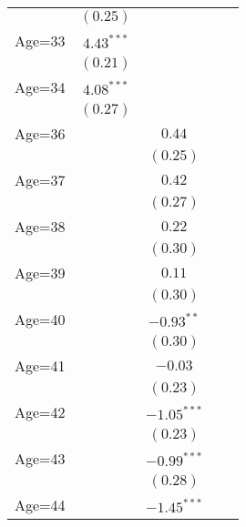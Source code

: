 \documentclass[fullpage]{paper}
\begin{document}
\begin{center}
\begin{longtable}{l c c c c }
            & $(0.25)$      &               &               &               \\
Age=33      & $4.43^{***}$  &               &               &               \\
            & $(0.21)$      &               &               &               \\
Age=34      & $4.08^{***}$  &               &               &               \\
            & $(0.27)$      &               &               &               \\
Age=36      &               & $0.44$        &               &               \\
            &               & $(0.25)$      &               &               \\
Age=37      &               & $0.42$        &               &               \\
            &               & $(0.27)$      &               &               \\
Age=38      &               & $0.22$        &               &               \\
            &               & $(0.30)$      &               &               \\
Age=39      &               & $0.11$        &               &               \\
            &               & $(0.30)$      &               &               \\
Age=40      &               & $-0.93^{**}$  &               &               \\
            &               & $(0.30)$      &               &               \\
Age=41      &               & $-0.03$       &               &               \\
            &               & $(0.23)$      &               &               \\
Age=42      &               & $-1.05^{***}$ &               &               \\
            &               & $(0.23)$      &               &               \\
Age=43      &               & $-0.99^{***}$ &               &               \\
            &               & $(0.28)$      &               &               \\
Age=44      &               & $-1.45^{***}$ &               &               \\

\end{longtable}
\end{center}
\end{document}

